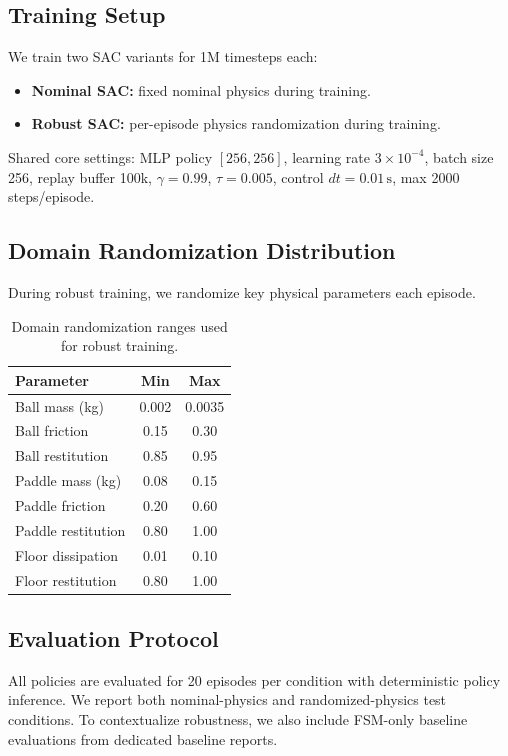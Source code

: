 \documentclass[10pt,twocolumn,letterpaper]{article}
\begin{document}
\subsection{Training Setup}
We train two SAC variants for 1M timesteps each:
\begin{itemize}
    \item \textbf{Nominal SAC:} fixed nominal physics during training.
    \item \textbf{Robust SAC:} per-episode physics randomization during training.
\end{itemize}
Shared core settings: MLP policy \([256,256]\), learning rate \(3\times 10^{-4}\), batch size 256, replay buffer 100k, \(\gamma=0.99\), \(\tau=0.005\), control \(dt=0.01\,\mathrm{s}\), max 2000 steps/episode.

\subsection{Domain Randomization Distribution}
During robust training, we randomize key physical parameters each episode.

\begin{table}[t]
\centering
\caption{Domain randomization ranges used for robust training.}
\label{tab:dr_ranges}
\begin{tabular}{lcc}
\toprule
Parameter & Min & Max \\
\midrule
Ball mass (kg) & 0.002 & 0.0035 \\
Ball friction & 0.15 & 0.30 \\
Ball restitution & 0.85 & 0.95 \\
Paddle mass (kg) & 0.08 & 0.15 \\
Paddle friction & 0.20 & 0.60 \\
Paddle restitution & 0.80 & 1.00 \\
Floor dissipation & 0.01 & 0.10 \\
Floor restitution & 0.80 & 1.00 \\
\bottomrule
\end{tabular}
\end{table}

\subsection{Evaluation Protocol}
All policies are evaluated for 20 episodes per condition with deterministic policy inference. We report both nominal-physics and randomized-physics test conditions. To contextualize robustness, we also include FSM-only baseline evaluations from dedicated baseline reports.
\end{document}
